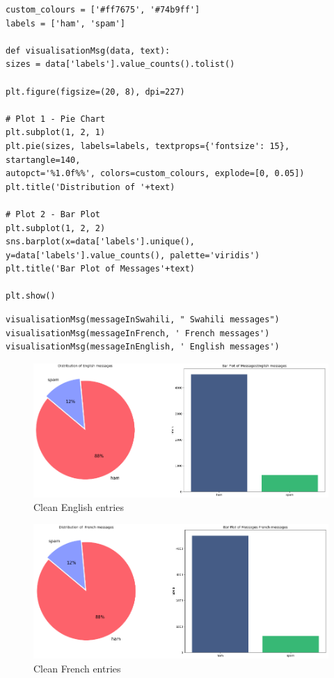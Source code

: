 \documentclass[12pt,a4paper, oneside]{book}
\begin{document}
\begin{lstlisting}[style=stylejupyter]
custom_colours = ['#ff7675', '#74b9ff']
labels = ['ham', 'spam']

def visualisationMsg(data, text):
sizes = data['labels'].value_counts().tolist()

plt.figure(figsize=(20, 8), dpi=227)

# Plot 1 - Pie Chart
plt.subplot(1, 2, 1)
plt.pie(sizes, labels=labels, textprops={'fontsize': 15}, startangle=140, 
autopct='%1.0f%%', colors=custom_colours, explode=[0, 0.05])
plt.title('Distribution of '+text)

# Plot 2 - Bar Plot
plt.subplot(1, 2, 2)
sns.barplot(x=data['labels'].unique(), y=data['labels'].value_counts(), palette='viridis')
plt.title('Bar Plot of Messages'+text)

plt.show() 
\end{lstlisting} 
\begin{lstlisting}[style=stylejupyter]
visualisationMsg(messageInSwahili, " Swahili messages") 
visualisationMsg(messageInFrench, ' French messages')  
visualisationMsg(messageInEnglish, ' English messages')
\end{lstlisting}
\begin{figure}[h]
	\centering
	\includegraphics[width=01\linewidth]{CollectImages/EnglishPlot} 
	\caption{Clean English entries }
	\label{cleanEnglishEntrie}
\end{figure}
\begin{figure}[h]
	\centering
	\includegraphics[width=01\linewidth]{CollectImages/frenchPlot} 
	\caption{Clean French entries }
	\label{cleanFrenchEntrie}
\end{figure}
\end{document}
